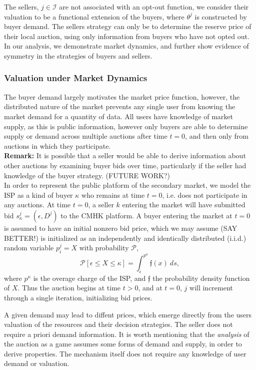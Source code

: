 \documentclass[12pt]{article}
\theoremstyle{definition}
\newcommand{\mcI}{\mathcal{I}}
\begin{document}
\begin{multicols}{2}
The sellers, $j\in\mcI$ are not associated with an opt-out function, we
consider their valuation to be a functional extension of the buyers, where
$\theta^j$ is constructed by buyer demand.
The sellers strategy can only be to determine the reserve price of their local
auction, using only information from buyers who have not opted out.
In our analysis, we demonstrate market dynamics, and further show evidence of symmetry in the strategies of
buyers and sellers.

\subsubsection{Valuation under Market Dynamics}
The buyer demand largely motivates the market price function, however, the
distributed nature of the market prevents any single user from knowing the
market demand for a quantity of data. All users have knowledge of market
supply, as this is public information, however only buyers
are able to determine supply or demand across multiple auctions after time $t=0$, and then only from auctions
in which they participate. \\
\textbf{Remark:}
It is possible that a seller would be able to derive information about other
auctions by examining buyer bids over time, particularly if the seller had knowledge of the
buyer strategy. (FUTURE WORK?)\\
In order to represent the public platform of the secondary market, we model the ISP as
a kind of buyer $\kappa$ who remains at time $t=0$, i.e. does not participate
in any auctions. At time $t=0$, a seller $k$ entering the market will have submitted bid
$s_\kappa^j =(\epsilon, D^j)$ to the CMHK platform. A buyer entering the market
at $t=0$ is assumed to have an initial nonzero bid price, which we may assume
(SAY BETTER!) is initialized as 
an independently and identically distributed (i.i.d.) random variable $p_i^j=X$ with
probability $\mathcal{P}$,
$$
    \mathcal{P}[\epsilon\le X \le \kappa] =
\displaystyle\int_\epsilon^{p^\kappa} \mathfrak{f}(x) \
ds,
$$
where $p^\kappa$ is the overage charge of the ISP, and $\mathfrak{f}$ the probability
density function of $X$.
Thus the auction
begins at time $t>0$, and at $t=0$, $j$ will increment through a single iteration,
initializing bid prices.

A given demand may lead to diffent prices, which emerge directly from the users valuation
of the resources and their decision strategies. The seller does not
require a priori demand information.
It is worth mentioning that the \emph{analysis} of the auction as
a game assumes some forms of demand and supply, in order to derive properties.
The mechanism itself does not require any knowledge of user demand or
valuation. 
\iffalse
The ISP overage
charge inducing an upper bound on the sellers' reserve prices implies that
supply will always be greater than demand, thereby reducing the sellers'
influence on market dynamics.
\fi


\end{multicols}
\end{document}
